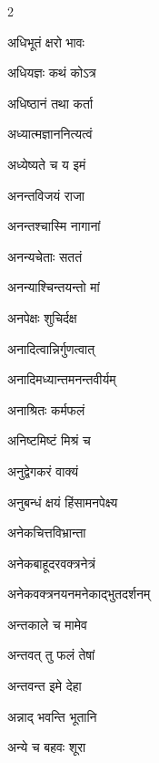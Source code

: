 \begin{multicols}{2}
\begin{indexlist}
\item अधिभूतं क्षरो भावः \dotfill {}
\item अधियज्ञः कथं कोऽत्र \dotfill {}
\item अधिष्ठानं तथा कर्ता \dotfill {}
\item अध्यात्मज्ञाननित्यत्वं \dotfill {}
\item अध्येष्यते च य इमं \dotfill {}
\item अनन्तविजयं राजा \dotfill {}
\item अनन्तश्चास्मि नागानां \dotfill {}
\item अनन्यचेताः सततं \dotfill {}
\item अनन्याश्चिन्तयन्तो मां \dotfill {}
\item अनपेक्षः शुचिर्दक्ष \dotfill {}
\item अनादित्वान्निर्गुणत्वात् \dotfill {}
\item अनादिमध्यान्तमनन्तवीर्यम् \dotfill {}
\item अनाश्रितः कर्मफलं \dotfill {}
\item अनिष्टमिष्टं मिश्रं च \dotfill {}
\item अनुद्वेगकरं वाक्यं \dotfill {}
\item अनुबन्धं क्षयं हिंसामनपेक्ष्य \dotfill {}
\item अनेकचित्तविभ्रान्ता \dotfill {}
\item अनेकबाहूदरवक्त्रनेत्रं \dotfill {}
\item अनेकवक्त्रनयनमनेकाद्भुतदर्शनम् \dotfill {}
\item अन्तकाले च मामेव \dotfill {}
\item अन्तवत् तु फलं तेषां \dotfill {}
\item अन्तवन्त इमे देहा \dotfill {}
\item अन्नाद् भवन्ति भूतानि \dotfill {}
\item अन्ये च बहवः शूरा \dotfill {}

\end{indexlist}
\end{multicols}
